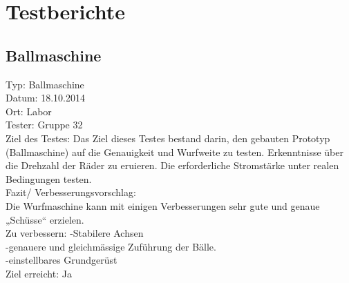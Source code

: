 \section{Testberichte}
\subsection{Ballmaschine}
Typ: Ballmaschine\\ 
Datum: 18.10.2014   \\
Ort: Labor \\
Tester: Gruppe 32 \\
Ziel des Testes:  Das Ziel dieses Testes bestand darin, den gebauten Prototyp (Ballmaschine) 
auf die Genauigkeit und Wurfweite zu testen. Erkenntnisse über die 
Drehzahl der Räder zu eruieren. Die erforderliche Stromstärke unter realen 
Bedingungen testen.  \\
Fazit/ 
Verbesserungsvorschlag: \\
Die Wurfmaschine kann mit einigen Verbesserungen sehr gute und genaue 
„Schüsse“ erzielen.  \\
Zu verbessern: 
-Stabilere Achsen  \\
-genauere und gleichmässige Zuführung der Bälle. \\
-einstellbares Grundgerüst \\
Ziel erreicht: Ja